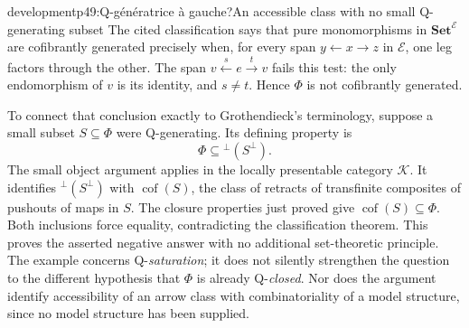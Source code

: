 \begin{dcomment}{development}{p49:Q-génératrice à gauche?}{An accessible class with no small Q-generating subset}
The cited classification says that pure monomorphisms in $\mathbf{Set}^{\mathcal E}$ are cofibrantly generated precisely when, for every span $y\leftarrow x\to z$ in $\mathcal E$, one leg factors through the other. The span $v\xleftarrow{s}e\xrightarrow{t}v$ fails this test: the only endomorphism of $v$ is its identity, and $s\ne t$. Hence $\Phi$ is not cofibrantly generated.

To connect that conclusion exactly to Grothendieck's terminology, suppose a small subset $S\subseteq\Phi$ were Q-generating. Its defining property is
\[
 \Phi\subseteq{}^\perp(S^\perp).
\]
The small object argument applies in the locally presentable category $\mathcal K$. It identifies ${}^\perp(S^\perp)$ with $\operatorname{cof}(S)$, the class of retracts of transfinite composites of pushouts of maps in $S$. The closure properties just proved give $\operatorname{cof}(S)\subseteq\Phi$. Both inclusions force equality, contradicting the classification theorem. This proves the asserted negative answer with no additional set-theoretic principle. The example concerns Q-\emph{saturation}; it does not silently strengthen the question to the different hypothesis that $\Phi$ is already Q-\emph{closed}. Nor does the argument identify accessibility of an arrow class with combinatoriality of a model structure, since no model structure has been supplied.
\end{dcomment}

